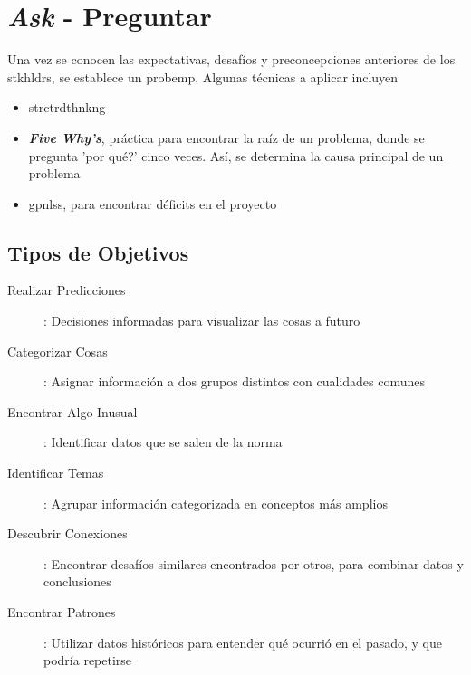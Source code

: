 \section{\textit{Ask} - Preguntar}
Una vez se conocen las expectativas, desafíos y preconcepciones anteriores de los \gls{stkhldrs}, se establece un \gls{probemp}. Algunas técnicas a aplicar incluyen
\begin{itemize}
    \item {\gls{strctrdthnkng}}
    \item {\textbf{\textit{Five Why's}}, práctica para encontrar la raíz de un problema, donde se pregunta 'por qué?' cinco veces. Así, se determina la causa principal de un problema}
    \item {\gls{gpnlss}, para encontrar déficits en el proyecto}
\end{itemize}

\subsection{Tipos de Objetivos}
\begin{description}
    \item [Realizar Predicciones]{: Decisiones informadas para visualizar las cosas a futuro}
    \item [Categorizar Cosas]{: Asignar información a dos grupos distintos con cualidades comunes}
    \item [Encontrar Algo Inusual]{: Identificar datos que se salen de la norma}
    \item [Identificar Temas]{: Agrupar información categorizada en conceptos más amplios}
    \item [Descubrir Conexiones]{: Encontrar desafíos similares encontrados por otros, para combinar datos y conclusiones}
    \item [Encontrar Patrones]{: Utilizar datos históricos para entender qué ocurrió en el pasado, y que podría repetirse}
\end{description}


